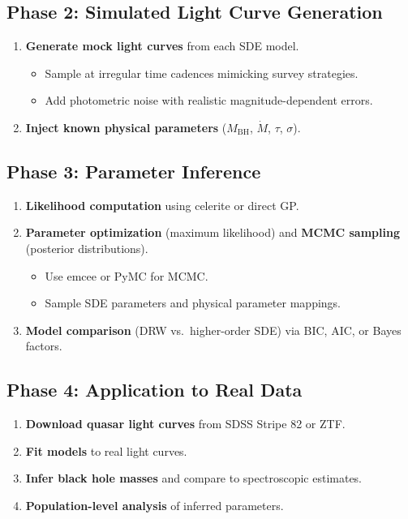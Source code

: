 \documentclass[11pt,a4paper]{article}
\begin{document}
\subsection{Phase 2: Simulated Light Curve Generation}
\begin{enumerate}[label=\textbf{2.\arabic*}]
  \item \textbf{Generate mock light curves} from each SDE model.
    \begin{itemize}
      \item Sample at irregular time cadences mimicking survey strategies.
      \item Add photometric noise with realistic magnitude-dependent errors.
    \end{itemize}
  \item \textbf{Inject known physical parameters} ($M_{\text{BH}}$, $\dot{M}$, $\tau$, $\sigma$).
\end{enumerate}

\subsection{Phase 3: Parameter Inference}
\begin{enumerate}[label=\textbf{3.\arabic*}]
  \item \textbf{Likelihood computation} using celerite or direct GP.
  \item \textbf{Parameter optimization} (maximum likelihood) and \textbf{MCMC sampling} (posterior distributions).
    \begin{itemize}
      \item Use emcee or PyMC for MCMC.
      \item Sample SDE parameters and physical parameter mappings.
    \end{itemize}
  \item \textbf{Model comparison} (DRW vs.\ higher-order SDE) via BIC, AIC, or Bayes factors.
\end{enumerate}

\subsection{Phase 4: Application to Real Data}
\begin{enumerate}[label=\textbf{4.\arabic*}]
  \item \textbf{Download quasar light curves} from SDSS Stripe 82 or ZTF.
  \item \textbf{Fit models} to real light curves.
  \item \textbf{Infer black hole masses} and compare to spectroscopic estimates.
  \item \textbf{Population-level analysis} of inferred parameters.
\end{enumerate}
\end{document}
